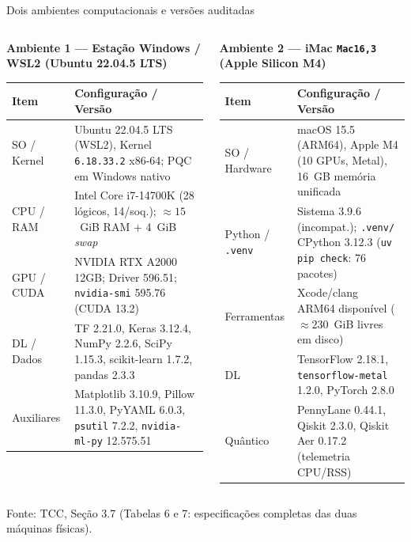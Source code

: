 \documentclass[aspectratio=169,11pt,brazil]{beamer}
\newcommand{\fonte}[1]{\par\vfill{\tiny\color{gray}Fonte: #1\par}}
\begin{document}
\begin{frame}{Dois ambientes computacionais e versões auditadas}
  \begin{columns}[T]
    \begin{column}{0.49\textwidth}
      \textbf{\scriptsize Ambiente 1 --- Estação Windows / WSL2 (Ubuntu 22.04.5 LTS)}
      \vspace{2pt}
      \scriptsize
      \begin{tabular}{@{}R{1.95cm}R{4.35cm}@{}}
        \toprule
        \textbf{Item} & \textbf{Configuração / Versão} \\
        \midrule
        SO / Kernel & Ubuntu 22.04.5 LTS (WSL2), Kernel \texttt{6.18.33.2} x86-64; PQC em Windows nativo \\
        CPU / RAM & Intel Core i7-14700K (28 lógicos, 14/soq.); $\approx 15$~GiB RAM + 4~GiB \textit{swap} \\
        GPU / CUDA & NVIDIA RTX A2000 12GB; Driver 596.51; \texttt{nvidia-smi} 595.76 (CUDA 13.2) \\
        DL / Dados & TF 2.21.0, Keras 3.12.4, NumPy 2.2.6, SciPy 1.15.3, scikit-learn 1.7.2, pandas 2.3.3 \\
        Auxiliares & Matplotlib 3.10.9, Pillow 11.3.0, PyYAML 6.0.3, \texttt{psutil} 7.2.2, \texttt{nvidia-ml-py} 12.575.51 \\
        \bottomrule
      \end{tabular}
    \end{column}
    \begin{column}{0.49\textwidth}
      \textbf{\scriptsize Ambiente 2 --- iMac \texttt{Mac16,3} (Apple Silicon M4)}
      \vspace{2pt}
      \scriptsize
      \begin{tabular}{@{}R{1.95cm}R{4.35cm}@{}}
        \toprule
        \textbf{Item} & \textbf{Configuração / Versão} \\
        \midrule
        SO / Hardware & macOS 15.5 (ARM64), Apple M4 (10 GPUs, Metal), 16~GB memória unificada \\
        Python / \texttt{.venv} & Sistema 3.9.6 (incompat.); \texttt{.venv/} CPython 3.12.3 (\texttt{uv pip check}: 76 pacotes) \\
        Ferramentas & Xcode/clang ARM64 disponível ($\approx 230$~GiB livres em disco) \\
        DL & TensorFlow 2.18.1, \texttt{tensorflow-metal} 1.2.0, PyTorch 2.8.0 \\
        Quântico & PennyLane 0.44.1, Qiskit 2.3.0, Qiskit Aer 0.17.2 (telemetria CPU/RSS) \\
        \bottomrule
      \end{tabular}
    \end{column}
  \end{columns}
  \fonte{TCC, Seção 3.7 (Tabelas 6 e 7: especificações completas das duas máquinas físicas).}
\end{frame}
\end{document}
